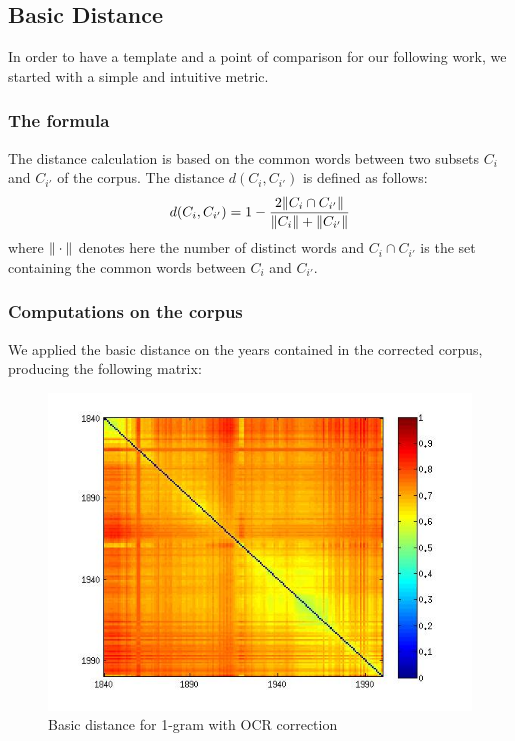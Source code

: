 \subsection{Basic Distance}

In order to have a template and a point of comparison for our following work, we started with a simple and intuitive metric.

\subsubsection{The formula}

The distance calculation is based on the common words between two subsets $C_i$ and $C_{i'}$ of the corpus. The distance $d(C_i,C_{i'})$ is defined as follows:
\begin{eqnarray}
 d(C_i,C_{i'}) = 1 - \frac{2 \Arrowvert C_i \cap C_{i'}\Arrowvert}{\Arrowvert C_i \Arrowvert + \Arrowvert C_{i'} \Arrowvert }
\end{eqnarray}
where $\Arrowvert \cdot \Arrowvert$ denotes here the number of distinct words and $C_i \cap C_{i'}$ is the set containing the common words between $C_i$ and $C_{i'}$.

\subsubsection{Computations on the corpus}

We applied the basic distance on the years contained in the corrected corpus, producing the following matrix:

\begin{figure}[H]
    \centering
    \includegraphics[scale=0.4]{Pictures/distance1/d1.jpg}
    \caption{Basic distance for 1-gram with OCR correction}
    \label{D1}
\end{figure}

